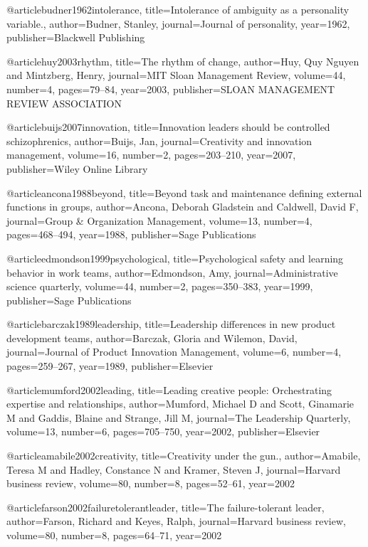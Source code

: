 @article{budner1962intolerance,
  title={Intolerance of ambiguity as a personality variable.},
  author={Budner, Stanley},
  journal={Journal of personality},
  year={1962},
  publisher={Blackwell Publishing}
}

@article{huy2003rhythm,
  title={The rhythm of change},
  author={Huy, Quy Nguyen and Mintzberg, Henry},
  journal={MIT Sloan Management Review},
  volume={44},
  number={4},
  pages={79--84},
  year={2003},
  publisher={SLOAN MANAGEMENT REVIEW ASSOCIATION}
}

@article{buijs2007innovation,
  title={Innovation leaders should be controlled schizophrenics},
  author={Buijs, Jan},
  journal={Creativity and innovation management},
  volume={16},
  number={2},
  pages={203--210},
  year={2007},
  publisher={Wiley Online Library}
}

@article{ancona1988beyond,
  title={Beyond task and maintenance defining external functions in groups},
  author={Ancona, Deborah Gladstein and Caldwell, David F},
  journal={Group \& Organization Management},
  volume={13},
  number={4},
  pages={468--494},
  year={1988},
  publisher={Sage Publications}
}

@article{edmondson1999psychological,
  title={Psychological safety and learning behavior in work teams},
  author={Edmondson, Amy},
  journal={Administrative science quarterly},
  volume={44},
  number={2},
  pages={350--383},
  year={1999},
  publisher={Sage Publications}
}

@article{barczak1989leadership,
  title={Leadership differences in new product development teams},
  author={Barczak, Gloria and Wilemon, David},
  journal={Journal of Product Innovation Management},
  volume={6},
  number={4},
  pages={259--267},
  year={1989},
  publisher={Elsevier}
}

@article{mumford2002leading,
  title={Leading creative people: Orchestrating expertise and relationships},
  author={Mumford, Michael D and Scott, Ginamarie M and Gaddis, Blaine and Strange, Jill M},
  journal={The Leadership Quarterly},
  volume={13},
  number={6},
  pages={705--750},
  year={2002},
  publisher={Elsevier}
}

@article{amabile2002creativity,
  title={Creativity under the gun.},
  author={Amabile, Teresa M and Hadley, Constance N and Kramer, Steven J},
  journal={Harvard business review},
  volume={80},
  number={8},
  pages={52--61},
  year={2002}
}

@article{farson2002failuretolerantleader,
  title={The failure-tolerant leader},
  author={Farson, Richard and Keyes, Ralph},
  journal={Harvard business review},
  volume={80},
  number={8},
  pages={64--71},
  year={2002}
}

